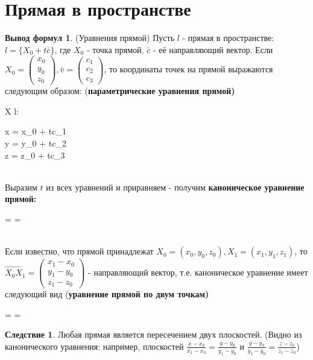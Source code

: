 \documentclass[a4paper, 12pt]{article}
\theoremstyle{definition}
\newtheorem*{consequense}{Следствие}
\newtheorem*{formulas}{Вывод формул}
\newenvironment{boxedalign*}
  {\begin{equation*}\begin{lrbox}{\boxedalignbox}$\begin{aligned}}
  {\end{aligned}$\end{lrbox}\fbox{\usebox{\boxedalignbox}}\end{equation*}}
\begin{document}
	\section{Прямая в пространстве}
	\begin{formulas}(Уравнения прямой)
		Пусть $l$ - прямая в пространстве: $l = \{X_0 + t\bar{c}\}$, где $X_0$ - точка прямой, $\bar{c}$ - её направляющий вектор. Если $X_0=\begin{pmatrix}x_{0}\\y_{0}\\z_0\end{pmatrix},\bar{v}=\begin{pmatrix}c_1\\c_2\\c_3\end{pmatrix}$, то координаты точек на прямой выражаются следующим образом: (\bfseries параметрические уравнения прямой\mdseries) \begin{boxedalign*}X \in l: \begin{cases}x = x_{0} + tc_1 \\ y = y_{0} + tc_2 \\ z = z_0 + tc_3\end{cases}\end{boxedalign*}\\
		Выразим $t$ из всех уравнений и приравняем - получим \bfseries каноническое уравнение прямой\mdseries : \begin{boxedalign*} =  = \end{boxedalign*}\\
		Если известно, что прямой принадлежат $X_0 = (x_{0}, y_{0}, z_0), X_1 = (x_{1}, y_{1}, z_1)$, то $\overrightarrow{X_0X_1} = \begin{pmatrix}x_{1} - x_{0}\\y_{1} - y_{0}\\z_1-z_0\end{pmatrix}$ - направляющий вектор, т.е. каноническое уравнение имеет следующий вид (\bfseries уравнение прямой по двум точкам\mdseries)\begin{boxedalign*} =  = \end{boxedalign*}
	\end{formulas}
	\begin{consequense}
		Любая прямая является пересечением двух плоскостей. (Видно из канонического уравнения: например, плоскостей $\frac{x-x_{0}}{x_{1}-x_{0}} = \frac{y-y_{0}}{y_{1}-y_{0}}$ и $\frac{y-y_{0}}{y_{1}-y_{0}} = \frac{z-z_{0}}{z_{1}-z_{0}}$) 
	\end{consequense}
\end{document}
